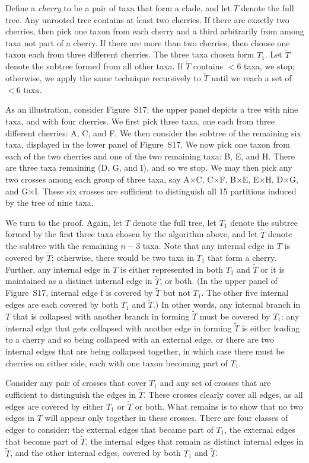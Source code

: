 \documentclass[12pt,letterpaper]{article}
\begin{document}
Define a \emph{cherry\/} to be a pair of taxa that form a clade, and
let $T$ denote the full tree.
Any unrooted tree contains at least two cherries.  If there are
exactly two cherries, then pick one taxon from each cherry and a 
third arbitrarily from among taxa not part of a cherry.  If there are
more than two cherries, then choose one taxon each from three
different cherries.  The three taxa chosen form $T_1$.  Let
$\tilde{T}$ denote the subtree formed from all other taxa.
If $\tilde{T}$ contains $< 6$ taxa, we stop; otherwise, we apply the
same technique recursively to $\tilde{T}$ until we reach a set of $<6$
taxa.  

As an illustration, consider Figure~S17; the upper panel depicts a
tree with nine taxa, and with four cherries.  We first pick three
taxa, one each from three different cherries: A, C, and F.  We then
consider the subtree of the remaining six taxa, displayed in the lower
panel of Figure~S17.  We now pick one taxon from each of the two
cherries and one of the two remaining taxa: B, E, and H.  There are
three taxa remaining (D, G, and I), and so we stop.  We may then pick
any two crosses among each group of three taxa, say A$\times$C,
C$\times$F, B$\times$E, E$\times$H, D$\times$G, and G$\times$I.  These
six crosses are sufficient to distinguish all 15 partitions induced by
the tree of nine taxa.

We turn to the proof.  Again, let $T$ denote the full tree, let
$T_1$ denote the subtree formed by the first three taxa chosen by the
algorithm above, and let $\tilde{T}$ denote the subtree with the
remaining $n-3$ taxa.  Note that any internal edge in $T$ is covered
by $\tilde{T}$; otherwise, there would be two taxa in $T_1$ that form
a cherry.  Further, any internal edge in $T$ is either represented in
both $T_1$ and $\tilde{T}$ or it is maintained as a distinct internal
edge in $\tilde{T}$, or both.  (In the upper panel of Figure~S17, internal edge
f is covered by $\tilde{T}$ but not $T_1$.  The other five internal
edges are each covered by both $T_1$ and $\tilde{T}$.)  In other
words, any internal branch in $T$ that is collapsed with another
branch in forming $\tilde{T}$ must be covered by $T_1$: 
any internal edge that gets collapsed with another edge in
forming $\tilde{T}$ is either leading to a cherry and so being collapsed
with an external edge, or there are two internal edges that are being
collapsed together, in which case there must be cherries on either
side, each with one taxon becoming part of $T_1$.

Consider any pair of crosses that cover $T_1$ and any set of crosses
that are sufficient to distinguish the edges in $\tilde{T}$.  These
crosses clearly cover all edges, as all edges
are covered by either $T_1$ or $\tilde{T}$ or both.  What remains is
to show that no two edges in $T$ will appear only together in these crosses.
There are four classes of edges to consider: the external edges that
became part of $T_1$, the external edges that become part of
$\tilde{T}$, 
the internal edges that remain as distinct internal edges in $\tilde{T}$, and the
other internal edges, covered by both $T_1$ and $\tilde{T}$.    
\end{document}
